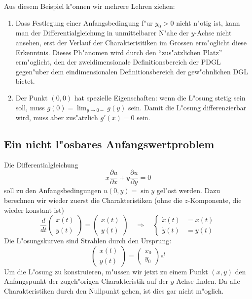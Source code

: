 Aus diesem Beispiel k"onnen wir mehrere Lehren ziehen: 
\begin{enumerate}
\item Dass Festlegung einer Anfangsbedingung f"ur $y_0>0$ nicht n"otig ist,
kann man der Differentialgleichung in unmittelbarer N"ahe der $y$-Achse nicht
ansehen, erst der Verlauf der Charakterisitiken im Grossen erm"oglicht
diese Erkenntnis. Dieses Ph"anomen wird durch den ``zus"atzlichen Platz''
erm"oglicht, den der zweidimensionale Definitionsbereich der PDGL gegen"uber dem
eindimensionalen Definitionsbereich der gew"ohnlichen DGL bietet.
\item Der Punkt $(0,0)$ hat spezielle Eigenschaften: wenn die L"osung stetig
sein soll, muss $g(0)=\lim_{y\to 0-} g(y)$ sein. Damit die L"osung differenzierbar
wird, muss aber zus"atzlich $g'(x)=0$ sein.
\end{enumerate}

\subsection{Ein nicht l"osbares Anfangswertproblem\label{unloesbar}}
Die Differentialgleichung
$$
x\frac{\partial u}{\partial x}
+
y\frac{\partial u}{\partial y}
=0
$$
soll zu den Anfangsbedingungen $u(0,y)=\sin y$ gel"ost werden.
Dazu berechnen wir wieder zuerst die Charakteristiken (ohne die 
$z$-Komponente, die wieder konstant ist)
$$
\frac{d}{dt}
\begin{pmatrix}
x(t)\\y(t)
\end{pmatrix}
=
\begin{pmatrix}
x(t)\\y(t)
\end{pmatrix}
\quad
\Rightarrow
\quad
\left\{
\begin{aligned}
\dot x(t)&=x(t)\\
\dot y(t)&=y(t)
\end{aligned}
\right.
$$
Die L"osungskurven sind Strahlen durch den Ursprung:
$$
\begin{pmatrix}
x(t)\\y(t)
\end{pmatrix}
=\begin{pmatrix}x_0\\y_0\end{pmatrix}e^t
$$
Um die L"osung zu konstruieren, m"ussen wir jetzt zu einem Punkt
$(x,y)$ den Anfangspunkt der zugeh"origen Charakteristik auf der $y$-Achse
finden. Da alle Charakteristiken durch den Nullpunkt gehen, ist dies 
gar nicht m"oglich. 


